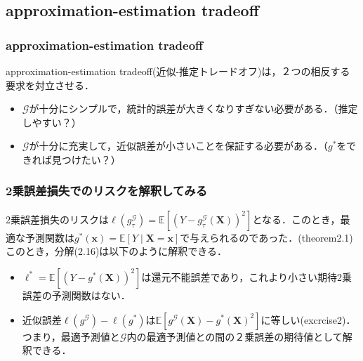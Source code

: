 \documentclass[dvipdfmx,cjk]{beamer}
\theoremstyle{example}
\begin{document}
\subsection{approximation-estimation tradeoff}
\begin{frame}
    \frametitle{approximation-estimation tradeoff}
    approximation-estimation tradeoff(近似-推定トレードオフ)は，２つの相反する要求を対立させる．
    \begin{itemize}
        \item $\mathcal{G}$が十分にシンプルで，統計的誤差が大きくなりすぎない必要がある．（推定しやすい？）
        \item $\mathcal{G}$が十分に充実して，近似誤差が小さいことを保証する必要がある．（$g^*$をできれば見つけたい？）
    \end{itemize}
\end{frame}

\begin{frame}
    \frametitle{2乗誤差損失でのリスクを解釈してみる}
    2乗誤差損失のリスクは$\ell(g^\mathcal{G}_\tau)=\mathbb{E}\left[(Y-g^\mathcal{G}_\tau(\boldsymbol{X}))^2\right]$となる．このとき，最適な予測関数は$g^*(\boldsymbol{x})=\mathbb{E}\left[Y\mid \boldsymbol{X}=\boldsymbol{x}\right]$で与えられるのであった．(theorem2.1)\\
    このとき，分解(2.16)は以下のように解釈できる．
    \begin{itemize}
        \item $\ell^*=\mathbb{E}\left[(Y-g^*(\boldsymbol{X}))^2\right]$は還元不能誤差であり，これより小さい期待2乗誤差の予測関数はない．
        \item 近似誤差$\ell(g^\mathcal{G})-\ell(g^*)$は$\mathbb{E}\left[g^\mathcal{G}(\boldsymbol{X})-g^*(\boldsymbol{X})^2\right]$に等しい(excrcise2)．つまり，最適予測値と$\mathcal{G}$内の最適予測値との間の２乗誤差の期待値として解釈できる．
    \end{itemize}
\end{frame}
\end{document}
